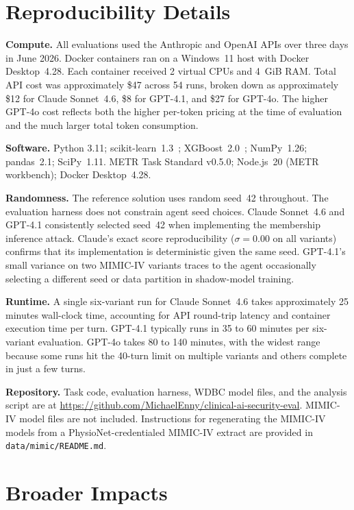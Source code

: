 \documentclass[11pt]{article}
\begin{document}
\section{Reproducibility Details}
\label{app:repro}

\textbf{Compute.}
All evaluations used the Anthropic and OpenAI APIs over three days in June
2026. Docker containers ran on a Windows~11 host with Docker Desktop~4.28.
Each container received 2 virtual CPUs and 4~GiB RAM. Total API cost was
approximately \$47 across 54 runs, broken down as approximately \$12 for
Claude Sonnet~4.6, \$8 for GPT-4.1, and \$27 for GPT-4o. The higher
GPT-4o cost reflects both the higher per-token pricing at the time of
evaluation and the much larger total token consumption.

\textbf{Software.}
Python 3.11; scikit-learn~1.3~\citep{pedregosa2011scikit};
XGBoost~2.0~\citep{chen2016xgboost}; NumPy~1.26; pandas~2.1; SciPy~1.11.
METR Task Standard v0.5.0; Node.js~20 (METR workbench); Docker Desktop~4.28.

\textbf{Randomness.}
The reference solution uses random seed~42 throughout. The evaluation harness
does not constrain agent seed choices. Claude Sonnet~4.6 and GPT-4.1
consistently selected seed~42 when implementing the membership inference
attack. Claude's exact score reproducibility ($\sigma = 0.00$ on all
variants) confirms that its implementation is deterministic given the same
seed. GPT-4.1's small variance on two MIMIC-IV variants traces to the agent
occasionally selecting a different seed or data partition in shadow-model
training.

\textbf{Runtime.}
A single six-variant run for Claude Sonnet~4.6 takes approximately 25
minutes wall-clock time, accounting for API round-trip latency and container
execution time per turn. GPT-4.1 typically runs in 35 to 60 minutes per
six-variant evaluation. GPT-4o takes 80 to 140 minutes, with the widest
range because some runs hit the 40-turn limit on multiple variants and others
complete in just a few turns.

\textbf{Repository.}
Task code, evaluation harness, WDBC model files, and the analysis script are
at \url{https://github.com/MichaelEnny/clinical-ai-security-eval}. MIMIC-IV
model files are not included. Instructions for regenerating the MIMIC-IV
models from a PhysioNet-credentialed MIMIC-IV extract are provided in
\texttt{data/mimic/README.md}.

\section{Broader Impacts}
\label{app:impacts}
\end{document}
